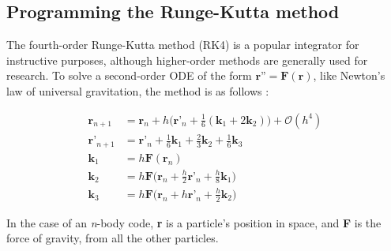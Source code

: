 \documentclass{article}
\begin{document}
\subsection{Programming the Runge-Kutta method}

The fourth-order Runge-Kutta method (RK4) is a popular integrator for instructive purposes, although higher-order methods are generally used for research. To solve a second-order ODE of the form $\textbf{r''} = \textbf{F}(\textbf{r})$, like Newton's law of universal gravitation, the method is as follows \cite{olver1965handbook}:

\begin{align}
  \textbf{r}_{n+1} &= \textbf{r}_n + h\bigg(\textbf{r'}_n + \frac{1}{6}(\textbf{k}_1 + 2\textbf{k}_2)\bigg) + \mathcal{O}(h^4) \\
  \textbf{r'}_{n+1} &= \textbf{r'}_n + \frac{1}{6}\textbf{k}_1 + \frac{2}{3}\textbf{k}_2 + \frac{1}{6}\textbf{k}_3 \\
  \textbf{k}_1 &= h\textbf{F}(\textbf{r}_n) \\
  \textbf{k}_2 &= h\textbf{F}\bigg(\textbf{r}_n + \frac{h}{2}\textbf{r'}_n + \frac{h}{8}\textbf{k}_1\bigg) \\
  \textbf{k}_3 &= h\textbf{F}\bigg(\textbf{r}_n + h\textbf{r'}_n + \frac{h}{2}\textbf{k}_2\bigg)
\end{align}

In the case of an \textit{n}-body code, \textbf{r} is a particle's position in space, and \textbf{F} is the force of gravity, from all the other particles.
\end{document}

